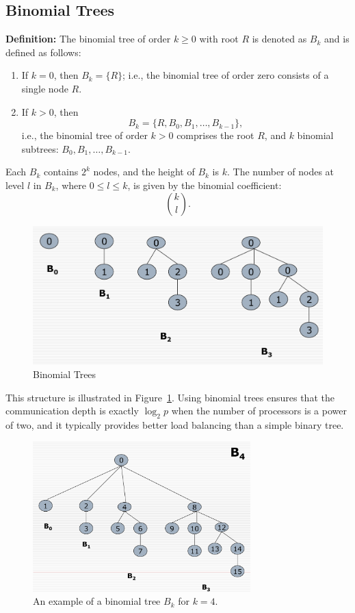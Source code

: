 \documentclass[12pt]{book}
\begin{document}
\subsection*{Binomial Trees}
\textbf{Definition:} The binomial tree of order $k \geq 0$ with root $R$ is denoted as $B_k$ and is defined as follows:
\begin{enumerate}
    \item If $k=0$, then $B_k = \{R\}$; i.e., the binomial tree of order zero consists of a single node $R$.
    \item If $k>0$, then 
    \[
    B_k = \{R, B_0, B_1, \ldots, B_{k-1}\},
    \]
    i.e., the binomial tree of order $k>0$ comprises the root $R$, and $k$ binomial subtrees: $B_0, B_1, \ldots, B_{k-1}$.
\end{enumerate}

Each $B_k$ contains $2^k$ nodes, and the height of $B_k$ is $k$. The number of nodes at level $l$ in $B_k$, where $0 \leq l \leq k$, is given by the binomial coefficient:
\[
\binom{k}{l}.
\]

\begin{figure}
    \centering
    \includegraphics[width=0.75\linewidth]{images/binomial_trees.png}
    \caption{Binomial Trees}
    \label{fig:binom_trees}
\end{figure}
This structure is illustrated in Figure~\ref{fig:binom_trees}. Using binomial trees ensures that the communication depth is exactly $\log_2 p$ when the number of processors is a power of two, and it typically provides better load balancing than a simple binary tree.

\begin{figure}[H]
    \centering
    \includegraphics[width=0.75\textwidth]{images/binomial_tree_example.png}
    \caption{An example of a binomial tree $B_k$ for $k=4$.}
    \label{fig:binomial_tree}
\end{figure}
\end{document}
